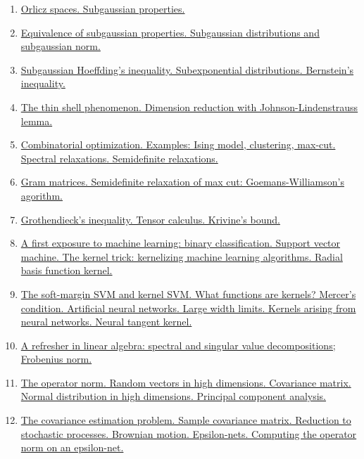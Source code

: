 \documentclass[11pt]{article}
\begin{document}
\begin{enumerate}
	\item \href{https://mp.weixin.qq.com/s/5qf7-hB6mIEbsRjMYcErJg}{Orlicz spaces. Subgaussian properties.}	%
	\item \href{https://mp.weixin.qq.com/s/Nm4CqJV4XC9761byMAekWA}{Equivalence of subgaussian properties. Subgaussian distributions and subgaussian norm.}	%
	\item \href{https://mp.weixin.qq.com/s/cDfRb_xTbCT_sG31TL8ksw}{Subgaussian Hoeffding's inequality. Subexponential distributions. Bernstein's inequality.}	%
	\item \href{https://mp.weixin.qq.com/s/7FGIIXa3JKmT-UwzLWeuxQ}{The thin shell phenomenon. Dimension reduction with Johnson-Lindenstrauss lemma.}	%
	\item \href{https://mp.weixin.qq.com/s/5Q1pSwUM8_LttHz0oma9_Q}{Combinatorial optimization. Examples: Ising model, clustering, max-cut. Spectral relaxations. Semidefinite relaxations.}	%
	\item \href{https://mp.weixin.qq.com/s/4_eM4wszQpckftwn-htYWQ}{Gram matrices. Semidefinite relaxation of max cut: Goemans-Williamson's agorithm.}	%
	\item \href{https://mp.weixin.qq.com/s/7TlzvHVsc2vWOGekeRcCUA}{Grothendieck's inequality. Tensor calculus. Krivine's bound.}	%
	\item \href{https://mp.weixin.qq.com/s/X6-kP4lXGsHjMokQSKnq1w}{A first exposure to machine learning: binary classification. Support vector machine. The kernel trick: kernelizing machine learning algorithms. Radial basis function kernel.}	%
	\item \href{https://mp.weixin.qq.com/s/_7f2VR_D5a1hFCyHK6M0bg}{The soft-margin SVM and kernel SVM. What functions are kernels? Mercer's condition. Artificial neural networks. Large width limits. Kernels arising from neural networks. Neural tangent kernel.}	%
	\item \href{https://mp.weixin.qq.com/s/vS54BsG3isidtbzjInyncQ}{A refresher in linear algebra: spectral and singular value decompositions; Frobenius norm.}	%
	\item \href{https://mp.weixin.qq.com/s/jqgImnWqKsTPFRkdrCaUCw}{The operator norm. Random vectors in high dimensions. Covariance matrix. Normal distribution in high dimensions. Principal component analysis.}	%
	\item \href{https://mp.weixin.qq.com/s/jHcGtlgiLk7EXr77cBarUQ}{The covariance estimation problem. Sample covariance matrix. Reduction to stochastic processes. Brownian motion. Epsilon-nets. Computing the operator norm on an epsilon-net.}	%

\end{enumerate}
\end{document}

